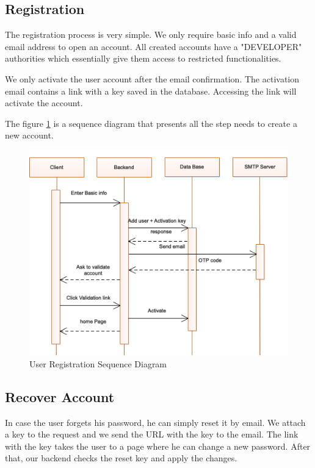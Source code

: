 \begin{spacing}{1.2}
\subsection{Registration}
The registration process is very simple. We only require basic info and a valid email address to open an account. All created accounts have a "DEVELOPER" authorities which essentially give them access to restricted functionalities.

We only activate the user account after the email confirmation. The activation email contains a link with a key saved in the database. Accessing the link will activate the account.

The figure \ref{fig:register} is a sequence diagram that presents all the step needs to create a new account.

\begin{figure}[H]\centering
\includegraphics[scale=0.8]{Register_user_sequence_diagram.png}
\caption{User Registration Sequence Diagram}
\label{fig:register}
\end{figure}



\subsection{Recover Account}
In case the user forgets his password, he can simply reset it by email. We attach a key to the request and we send the URL with the key to the email. The link with the key takes the user to a page where he can change a new password. After that, our backend checks the reset key and apply the changes.


\end{spacing}
